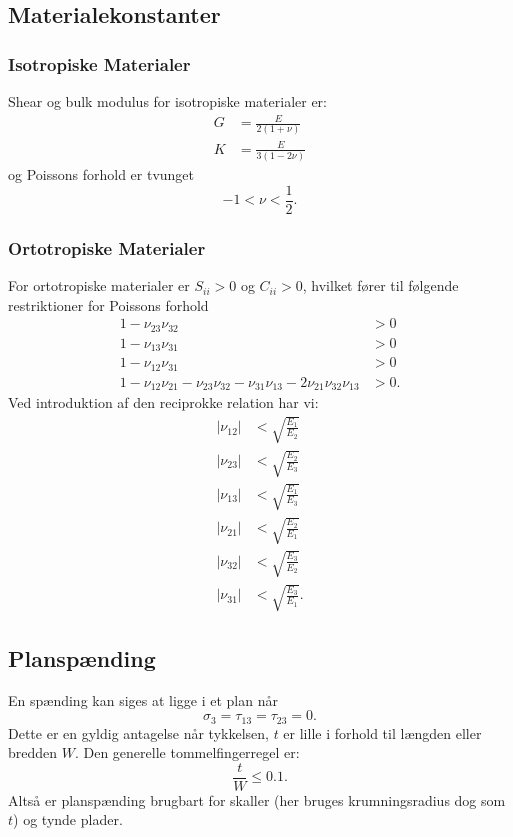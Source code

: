 \subsection{Materialekonstanter}

\subsubsection{Isotropiske Materialer}
Shear og bulk modulus for isotropiske materialer er:
\begin{align*}
  G &= \frac{E}{2 \left( 1 + \nu \right)} \\
  K &= \frac{E}{3 \left( 1 - 2\nu \right)}
\end{align*}
og Poissons forhold er tvunget
\begin{equation*}
  -1 < \nu < \frac{1}{2}
.\end{equation*}

\subsubsection{Ortotropiske Materialer}
For ortotropiske materialer er $S_{ii} > 0$ og $C_{ii} > 0$, hvilket fører til følgende restriktioner for Poissons forhold
\begin{align*}
  1 - \nu_{23} \nu_{32} &> 0 \\
  1 - \nu_{13} \nu_{31} &>0 \\
  1 - \nu_{12}\nu_{31} &> 0 \\
  1 - \nu_{12}\nu_{21} - \nu_{23}\nu_{32} - \nu_{31}\nu_{13} - 2\nu_{21}\nu_{32}\nu_{13} &> 0
.\end{align*}
Ved introduktion af den reciprokke relation har vi:
\begin{align*}
  \left| \nu_{12} \right| &< \sqrt{\frac{E_1}{E_2}} \\
  \left| \nu_{23} \right| &< \sqrt{\frac{E_2}{E_3}} \\
  \left| \nu_{13} \right| &< \sqrt{\frac{E_1}{E_3}} \\
  \left| \nu_{21} \right| &< \sqrt{\frac{E_2}{E_1}} \\
  \left| \nu_{32} \right| &< \sqrt{\frac{E_3}{E_2}} \\
  \left| \nu_{31} \right| &< \sqrt{\frac{E_3}{E_1}}
.\end{align*}

\subsection{Planspænding}
En spænding kan siges at ligge i et plan når
\begin{equation*}
  \sigma_3 = \tau_{13} = \tau_{23} = 0
.\end{equation*}
Dette er en gyldig antagelse når tykkelsen, $t$ er lille i forhold til længden eller bredden $W$.
Den generelle tommelfingerregel er:
\begin{equation*}
  \frac{t}{W} \leq \num{0,1} 
.\end{equation*}
Altså er planspænding brugbart for skaller (her bruges krumningsradius dog som $t$) og tynde plader.

